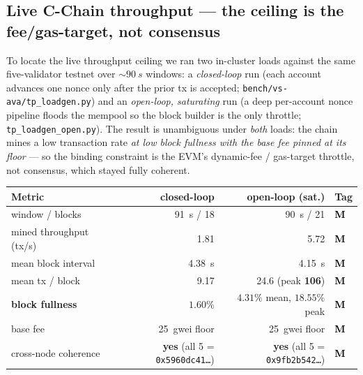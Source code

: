 \documentclass[11pt,a4paper]{article}
\newcommand{\Mnow}{\textbf{\textcolor{black}{M}}}   %
\begin{document}
\subsection{Live C-Chain throughput --- the ceiling is the fee/gas-target, not consensus}
\label{sec:eval:tput}

To locate the live throughput ceiling we ran two in-cluster loads against the same
five-validator testnet over \(\sim\!\SI{90}{s}\) windows: a \emph{closed-loop} run (each
account advances one nonce only after the prior tx is accepted;
\texttt{bench/vs-ava/tp\_loadgen.py}) and an \emph{open-loop, saturating} run (a deep
per-account nonce pipeline floods the mempool so the block builder is the only throttle;
\texttt{tp\_loadgen\_open.py}). The result is unambiguous under \emph{both} loads: the chain
mines a low transaction rate \emph{at low block fullness with the base fee pinned at its floor}
--- so the binding constraint is the EVM's dynamic-fee / gas-target throttle, not consensus,
which stayed fully coherent.

\begin{center}
\begin{tabular}{@{}l r r l@{}}
\toprule
\textbf{Metric} & \textbf{closed-loop} & \textbf{open-loop (sat.)} & \textbf{Tag} \\
\midrule
window / blocks               & \SI{91}{s} / 18 & \SI{90}{s} / 21 & \Mnow \\
mined throughput (tx/s)       & \num{1.81}      & \num{5.72}      & \Mnow \\
mean block interval           & \SI{4.38}{s}    & \SI{4.15}{s}    & \Mnow \\
mean tx / block               & \num{9.17}      & \num{24.6} (peak \textbf{106}) & \Mnow \\
\textbf{block fullness}       & \(\mathbf{1.60\%}\) & \(\mathbf{4.31\%}\) mean, \(\mathbf{18.55\%}\) peak & \Mnow \\
base fee                      & \SI{25}{gwei} floor & \SI{25}{gwei} floor & \Mnow \\
cross-node coherence          & \textbf{yes} (all 5 = \texttt{0x5960dc41\dots}) & \textbf{yes} (all 5 = \texttt{0x9fb2b542\dots}) & \Mnow \\
\bottomrule
\end{tabular}
\end{center}
\end{document}
